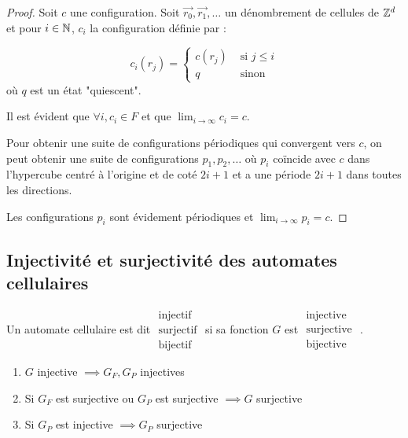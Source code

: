 \begin{proof}
	Soit $c$ une configuration. Soit $\vec {r_0}, \vec {r_1},\ldots$ un dénombrement de cellules de $\mathbb{Z}^d$ et pour $i \in \mathbb{N}$,
	$c_i$ la configuration définie par :

	$$ c_i(r_j) = \left\{ \begin{array}{cc}
			c(r_j) & \text{ si } j \leq i \\
			q      & \text{ sinon }
		\end{array}
		\right.$$
	où $q$ est un état "quiescent".

	Il est évident que $\forall i, c_i \in F$ et que $\lim_{i \to \infty} c_i = c$.

	Pour obtenir une suite de configurations périodiques qui convergent vers $c$, on peut obtenir une suite de configurations
	$p_1, p_2, \ldots $ où $p_i$ coïncide avec $c$ dans l'hypercube centré à l'origine et de coté $2i + 1$ et a une
	période $2i + 1$ dans toutes les directions.

	Les configurations $p_i$ sont évidement périodiques et $\lim_{i \to \infty} p_i = c$.
\end{proof}

\subsection{Injectivité et surjectivité des automates cellulaires}

\begin{definition}
	Un automate cellulaire est dit
	$\begin{array}{c}
			\text{injectif}  \\
			\text{surjectif} \\
			\text{bijectif}
		\end{array}$
	si sa fonction $G$ est
	$\begin{array}{c}
			\text{injective}  \\
			\text{surjective} \\
			\text{bijective}
		\end{array}$
	.
\end{definition}


\begin{theorem}
	\begin{enumerate}
		\item $G$ injective $\implies G_F, G_P$ injectives \label{thm:big1}
		\item Si $G_F$ est surjective ou $G_P$ est surjective $\implies G$ surjective \label{thm:big2}
		\item Si $G_P$ est injective $\implies G_P$ surjective \label{thm:big3}
	\end{enumerate}
\end{theorem}

